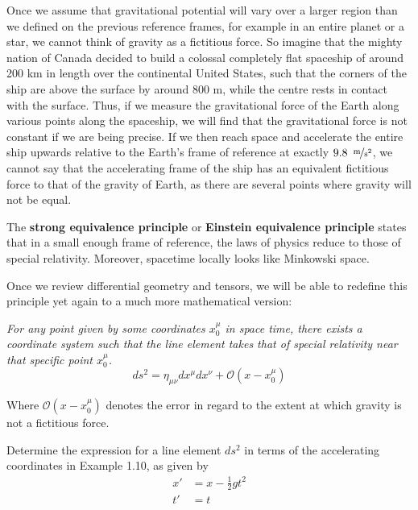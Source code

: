 \documentclass{article}
\begin{document}
\begin{exmp}
 			Once we assume that gravitational potential will vary over a larger region than we defined on the previous reference frames, for example in an entire planet or a star, we cannot think of gravity as a fictitious force. So imagine that the mighty nation of Canada decided to build a colossal completely flat spaceship of around 200 km in length over the continental United States, such that the corners of the ship are above the surface by around 800 m, while the centre rests in contact with the surface.
 			Thus, if we measure the gravitational force of the Earth along various points along the spaceship, we will find that the gravitational force is not constant if we are being precise. If we then reach space and accelerate the entire ship upwards relative to the Earth's frame of reference at exactly $9.8 \,\,\, \nicefrac{\text{m}}{\text{s}^2}$, we cannot say that the accelerating frame of the ship has an equivalent fictitious force to that of the gravity of Earth, as there are several points where gravity will not be equal. 
 			
 			\begin{defn}
 				\label{defn:StrongEquivalence}
 				The \textbf{strong equivalence principle} or \textbf{Einstein equivalence principle} states that in a small enough frame of reference, the laws of physics reduce to those of special relativity. Moreover, spacetime locally looks like Minkowski space.
 			\end{defn}
 		
 			Once we review differential geometry and tensors, we will be able to redefine this principle yet again to a much more mathematical version:
 			
 				\textit{For any point given by some coordinates $x_0^\mu$ in space time, there exists a coordinate system such that the line element takes that of special relativity near that specific point $x_0^\mu$. }
 				$$ ds^2 = \eta_{\mu\nu} dx^\mu dx^\nu + \mathcal{O}(x-x_0^\mu) $$
 		\end{exmp} \noindent
 		Where $\mathcal{O} (x-x_0^\mu)$ denotes the error in regard to the extent at which gravity is not a fictitious force.
 		\begin{exe}
 			Determine the expression for a line element $ds^2$ in terms of the accelerating coordinates in Example 1.10, as given by
 			\begin{align*}
 				x' &= x - \frac12 gt^2 \\
 				t' &= t
 			\end{align*}
 		\end{exe}
 	\pagebreak
\end{document}
